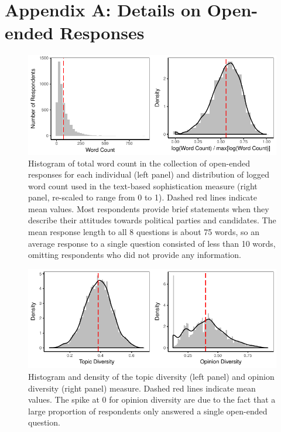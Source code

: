 \documentclass[12pt]{article}
\begin{document}
\singlespacing



\clearpage
\section*{Appendix A: Details on Open-ended Responses}
\renewcommand\thefigure{A.\arabic{figure}}
\renewcommand\thetable{A.\arabic{table}}
\setcounter{figure}{0}
\setcounter{table}{0}

\begin{figure}[h]\centering
\includegraphics{../fig/wc.pdf}
\caption{Histogram of total word count in the collection of open-ended responses for each individual (left panel) and distribution of logged word count used in the text-based sophistication measure (right panel, re-scaled to range from 0 to 1). Dashed red lines indicate mean values. Most respondents provide brief statements when they describe their attitudes towards political parties and candidates. The mean response length to all 8 questions is about 75 words, so an average response to a single question consisted of less than 10 words, omitting respondents who did not provide any information.}\label{fig:wc}
\end{figure}

\begin{figure}[h]\centering
\includegraphics{../fig/diversity.pdf}
\caption{Histogram and density of the topic diversity (left panel) and opinion diversity (right panel) measure. Dashed red lines indicate mean values. The spike at 0 for opinion diversity are due to the fact that a large proportion of respondents only answered a single open-ended question.}\label{fig:diversity}
\end{figure}
\end{document}
